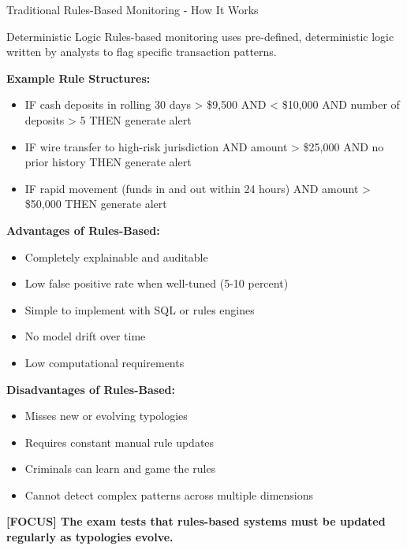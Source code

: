 \documentclass[11pt,a4paper]{beamer}
\newcommand{\examfocus}[1]{\textcolor{orange!80!black}{\textbf{[FOCUS] #1}}}
\begin{document}
	\begin{frame}{Traditional Rules-Based Monitoring - How It Works}
		\begin{block}{Deterministic Logic}
			Rules-based monitoring uses pre-defined, deterministic logic written by analysts to flag specific transaction patterns.
		\end{block}
		
		\textbf{Example Rule Structures:}
		\begin{itemize}
			\item IF cash deposits in rolling 30 days > \$9,500 AND < \$10,000 AND number of deposits > 5 THEN generate alert
			\item IF wire transfer to high-risk jurisdiction AND amount > \$25,000 AND no prior history THEN generate alert
			\item IF rapid movement (funds in and out within 24 hours) AND amount > \$50,000 THEN generate alert
		\end{itemize}
		
		\textbf{Advantages of Rules-Based:}
		\begin{itemize}
			\item Completely explainable and auditable
			\item Low false positive rate when well-tuned (5-10 percent)
			\item Simple to implement with SQL or rules engines
			\item No model drift over time
			\item Low computational requirements
		\end{itemize}
		
		\textbf{Disadvantages of Rules-Based:}
		\begin{itemize}
			\item Misses new or evolving typologies
			\item Requires constant manual rule updates
			\item Criminals can learn and game the rules
			\item Cannot detect complex patterns across multiple dimensions
		\end{itemize}
		
		\examfocus{The exam tests that rules-based systems must be updated regularly as typologies evolve.}
	\end{frame}
	
\end{document}
